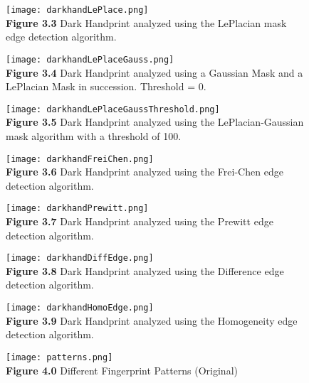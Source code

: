 \documentclass{article}%
\begin{document}
\newpage
\begin{figure}[h]
\centering
\texttt{[image: darkhandLePlace.png]}\\
{\bf Figure 3.3} Dark Handprint analyzed using the LePlacian mask edge detection algorithm.  
\end{figure}

\newpage
\begin{figure}[h]
\centering
\texttt{[image: darkhandLePlaceGauss.png]}\\
{\bf Figure 3.4} Dark Handprint analyzed using a Gaussian Mask and a LePlacian Mask in succession. Threshold = 0.   
\end{figure}

\newpage
\begin{figure}[h]
\centering
\texttt{[image: darkhandLePlaceGaussThreshold.png]}\\
{\bf Figure 3.5} Dark Handprint analyzed using the LePlacian-Gaussian mask algorithm with a threshold of 100.  
\end{figure}


\newpage
\begin{figure}[h]
\centering
\texttt{[image: darkhandFreiChen.png]}\\
{\bf Figure 3.6} Dark Handprint analyzed using the Frei-Chen edge detection algorithm.  
\end{figure}

\newpage
\begin{figure}[h]
\centering
\texttt{[image: darkhandPrewitt.png]}\\
{\bf Figure 3.7} Dark Handprint analyzed using the Prewitt edge detection algorithm.  
\end{figure}

\newpage
\begin{figure}[h]
\centering
\texttt{[image: darkhandDiffEdge.png]}\\
{\bf Figure 3.8} Dark Handprint analyzed using the Difference edge detection algorithm.  
\end{figure}

\newpage
\begin{figure}[h]
\centering
\texttt{[image: darkhandHomoEdge.png]}\\
{\bf Figure 3.9} Dark Handprint analyzed using the Homogeneity edge detection algorithm.  
\end{figure}

\clearpage

\newpage
\begin{figure}[h]
\centering
\texttt{[image: patterns.png]}\\
{\bf Figure 4.0} Different Fingerprint Patterns (Original)
\end{figure}
\end{document}
